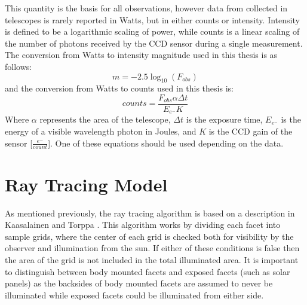 This quantity is the basis for all observations, however data from collected in telescopes is rarely reported in Watts, but in either counts or intensity. Intensity is defined to be a logarithmic scaling of power, while counts is a linear scaling of the number of photons received by the CCD sensor during a single measurement. The conversion from Watts to intensity magnitude used in this thesis is as follows:
\begin{equation}
m = -2.5\log_{10}(F_{obs})
\end{equation}
and the conversion from Watts to counts used in this thesis is:
\begin{equation}
counts = \frac{F_{obs}\alpha \Delta t}{E_{e^-} K}
\end{equation}
Where $\alpha$ represents the area of the telescope, $\Delta t$ is the exposure time, $E_{e^-}$ is the energy of a visible wavelength photon in Joules, and $K$ is the CCD gain of the sensor [$\frac{e^-}{count}$]. One of these equations should be used depending on the data.

\section{Ray Tracing Model}

As mentioned previously, the ray tracing algorithm is based on a description in Kaasalainen and Torppa \cite{kaasalainen_LCI}. This algorithm works by dividing each facet into sample grids, where the center of each grid is checked both for visibility by the observer and illumination from the sun. If either of these conditions is false then the area of the grid is not included in the total illuminated area. It is important to distinguish between body mounted facets and exposed facets (such as solar panels) as the backsides of body mounted facets are assumed to never be illuminated while exposed facets could be illuminated from either side.

